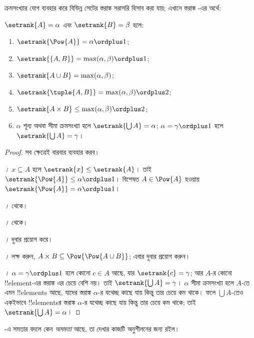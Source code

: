 \documentclass[../../../include/open-logic-section]{subfiles}
\begin{document}

ক্রমসংখ্যার যোগ ব্যবহার করে বিভিন্ন সেটের স্তরাঙ্ক
সরাসরি হিসাব করা যায়;
এখানে স্তরাঙ্ক -এর অর্থে:

\begin{lem}
$\setrank{A} = \alpha$ এবং $\setrank{B} = \beta$ হলে:
\begin{enumerate}
	\item{} $\setrank{\Pow{A}} = \alpha\ordplus 1$;
	\item{} $\setrank{\{A, B\}} = \max(\alpha,
	\beta) \ordplus 1$;
	\item{} $\setrank{A \cup B} = \max(\alpha,
	\beta)$;
	\item{} $\setrank{\tuple{A,B}} = \max(\alpha,
	\beta) \ordplus 2$;
	\item{} $\setrank{A \times B} \leq \max(\alpha,
	\beta) \ordplus 2$;
	\item{} $\alpha$ শূন্য অথবা সীমা ক্রমসংখ্যা হলে
	$\setrank{\bigcup A} = \alpha$; $\alpha = \gamma\ordplus 1$
	হলে $\setrank{\bigcup A} = \gamma$।
\end{enumerate}
\end{lem}

\begin{proof}
সব ক্ষেত্রেই  বারবার
ব্যবহার করব।

\emph{।} $x \subseteq A$ হলে
$\setrank{x} \leq \setrank{A}$। তাই
$\setrank{\Pow{A}} \leq \alpha \ordplus 1$। বিশেষত
$A \in \Pow{A}$ হওয়ায় $\setrank{\Pow{A}} =
\alpha \ordplus 1$।

\emph{।} 
থেকে।

\emph{।} 
থেকে।

\emph{।}  দুবার
প্রয়োগ করে।

\emph{।} লক্ষ করুন,
$A \times B \subseteq \Pow{\Pow{A \cup B}}$;
এবার  দুবার প্রয়োগ করুন।

\emph{।} $\alpha = \gamma\ordplus 1$
হলে কোনো $c \in A$ আছে, যার
$\setrank{c} = \gamma$; আর $A$-র কোনো !!{element}-এর
স্তরাঙ্ক এর চেয়ে বেশি নয়। তাই
$\setrank{\bigcup A} = \gamma$। $\alpha$ সীমা
ক্রমসংখ্যা হলে $A$-তে এমন !!{element}s আছে, যাদের
স্তরাঙ্ক $\alpha$-র যথেচ্ছ কাছে যায় কিন্তু তার চেয়ে
কম থাকে। ফলে $\bigcup A$-তেও একইভাবে
!!{element}sর স্তরাঙ্ক $\alpha$-র যথেচ্ছ কাছে
যায় কিন্তু তার চেয়ে কম থাকে; তাই
$\setrank{\bigcup A} = \alpha$।
\end{proof}
\noindent
{}-এ সমতার বদলে কেন \emph{অসমতা}
আছে, তা দেখার কাজটি অনুশীলনের জন্য রইল।
\end{document}
